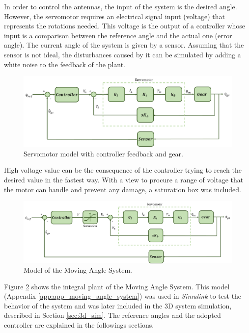 In order to control the antennas, the input of the system is the desired angle. However, the servomotor requires an electrical signal input (voltage) that represents the rotations needed. This voltage is the output of a controller whose input is a comparison between the reference angle and the actual one (error angle). The current angle of the system is given by a sensor.
Assuming that the sensor is not ideal, the disturbances caused by it can be simulated by adding a white noise to the feedback of the plant.

\begin{figure}[H]
\centerline{
\includegraphics[scale=0.45]{figures/servo+gear+noise.png}}
\caption{Servomotor model with controller feedback and gear.}
\label{model4}
\end{figure}

High voltage value can be the consequence of the controller trying to reach the desired value in the fastest way. With a view to procure a range of voltage that the motor can handle and prevent any damage, a saturation box was included.

\begin{figure}[H]
\centerline{
\includegraphics[scale=0.4]{figures/complete_model.png}}
\caption{Model of the Moving Angle System.}
\label{model4}
\end{figure}

Figure \ref{model4} shows the integral plant of the Moving Angle System. This model (Appendix \ref{app:app_moving_angle_system}) was used in \emph{Simulink} to test the behavior of the system and was later included in the 3D system simulation, described in Section \ref{sec:3d_sim}. The reference angles and the adopted controller are explained in the followings sections.